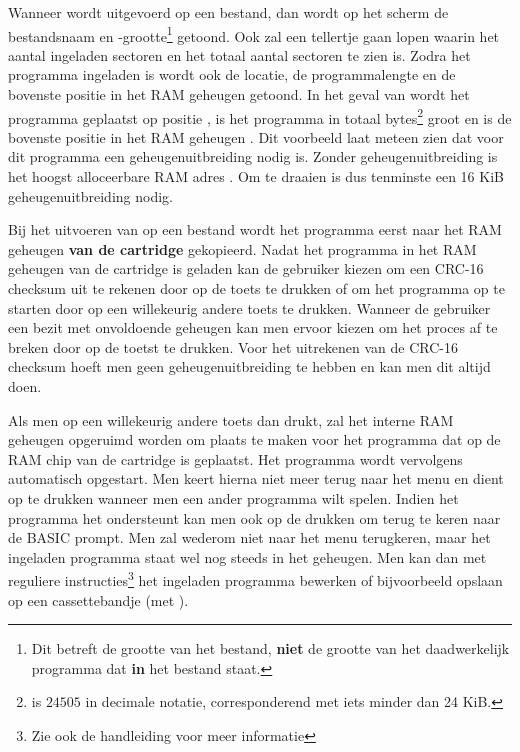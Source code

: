 
Wanneer  wordt uitgevoerd op een \cas bestand, dan wordt op het scherm de bestandsnaam en -grootte\footnote{Dit betreft de grootte van het \cas bestand, \textbf{niet} de grootte van het daadwerkelijk programma dat \textbf{in} het \cas bestand staat.} getoond. Ook zal een tellertje gaan lopen waarin het aantal ingeladen sectoren en het totaal aantal sectoren te zien is. Zodra het programma ingeladen is wordt ook de locatie, de programmalengte en de bovenste positie in het RAM geheugen getoond. In het geval van  wordt het programma geplaatst op positie , is het programma in totaal  bytes\footnote{ is $24505$ in decimale notatie, corresponderend met iets minder dan 24 KiB.} groot en is de bovenste positie in het RAM geheugen . Dit voorbeeld laat meteen zien dat voor dit programma een geheugenuitbreiding nodig is. Zonder geheugenuitbreiding is het hoogst alloceerbare RAM adres . Om  te draaien is dus tenminste een 16 KiB geheugenuitbreiding nodig.

Bij het uitvoeren van  op een \cas bestand wordt het programma eerst naar het RAM geheugen \textbf{van de cartridge} gekopieerd. Nadat het programma in het RAM geheugen van de cartridge is geladen kan de gebruiker kiezen om een CRC-16 checksum uit te rekenen door op de  toets te drukken of om het programma op te starten door op een willekeurig andere toets te drukken. Wanneer de gebruiker een \pc bezit met onvoldoende geheugen kan men ervoor kiezen om het proces af te breken door op de  toetst te drukken. Voor het uitrekenen van de CRC-16 checksum hoeft men geen geheugenuitbreiding te hebben en kan men dit altijd doen.

Als men op een willekeurig andere toets dan  drukt, zal het interne RAM geheugen opgeruimd worden om plaats te maken voor het programma dat op de RAM chip van de cartridge is geplaatst. Het programma wordt vervolgens automatisch opgestart. Men keert hierna niet meer terug naar het menu en dient op  te drukken wanneer men een ander programma wilt spelen. Indien het  programma het ondersteunt kan men ook op de  drukken om terug te keren naar de BASIC prompt. Men zal wederom niet naar het menu terugkeren, maar het ingeladen programma staat wel nog steeds in het geheugen. Men kan dan met reguliere  instructies\footnote{Zie ook de \pc handleiding voor meer informatie} het ingeladen programma bewerken of bijvoorbeeld opslaan op een cassettebandje (met ).

